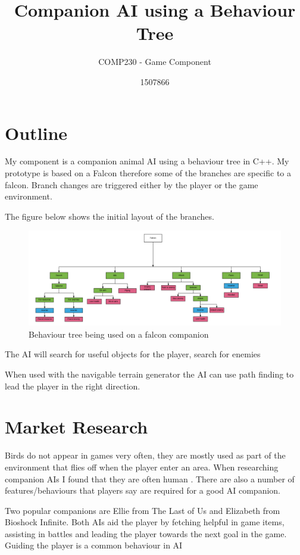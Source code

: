 \documentclass{scrartcl}
\title{ Companion AI using a Behaviour Tree }
\subtitle{COMP230 - Game Component}
\author{1507866}
\begin{document}
	
\maketitle
	
\section{Outline}
My component is a companion animal AI using a behaviour tree in C++. My prototype is based on a Falcon therefore some of the branches are specific to a falcon.  Branch changes are triggered either by the player or the game environment. 



The figure below shows the initial layout of the branches.
\begin{figure}[h]
	\includegraphics[width=1.2\linewidth]{behaviour_tree.png}
	\caption{ Behaviour tree being used on a falcon companion}
\end{figure} 

The AI will search for useful objects for the player, search for enemies

When used with the navigable terrain generator the AI can use path finding to lead the player in the right direction. 

\section{Market Research}
Birds do not appear in games very often, they are mostly used as part of the environment that flies off when the player enter an area.
When researching companion AIs I found that they are often human \cite{DragonAge, LastOfUs, Bioshock}. There are also a number of features/behaviours that players say are required for a good AI companion. 

Two popular companions are Ellie from The Last of Us and Elizabeth from Bioshock Infinite. Both AIs aid the player by fetching helpful in game items, assisting in battles and leading the player towards the next goal in the game.
Guiding the player is a common behaviour in AI 
\end{document}

